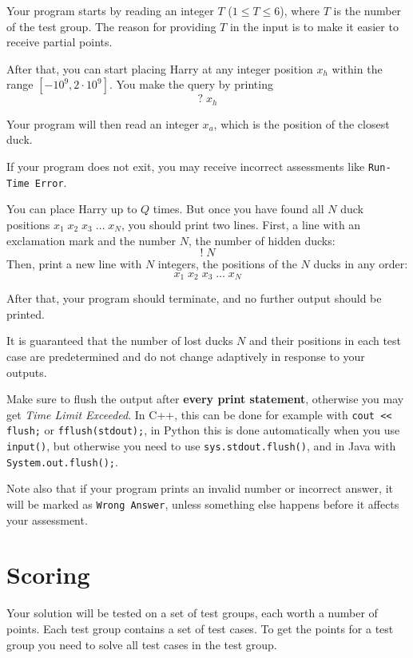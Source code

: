 Your program starts by reading an integer $T$ ($1 \leq T \leq 6$), where $T$ is the number of the test group. 
The reason for providing $T$ in the input is to make it easier to receive partial points.

After that, you can start placing Harry at any integer position $x_h$ within the range $[-10^9, 2 \cdot 10^9]$.
You make the query by printing 
$$? \; x_h$$

Your program will then read an integer $x_a$, which is the position of the closest duck. 

If your program does not exit, you may receive incorrect assessments like \texttt{Run-Time Error}.

You can place Harry up to $Q$ times. But once you have found all $N$ duck positions
$x_1 \; x_2 \; x_3 \; \dots \; x_N$, you should print two lines. 
First, a line with an exclamation mark and the number $N$, the number of hidden ducks:
$$! \; N$$
Then, print a new line with $N$ integers, the positions of the $N$ ducks in any order:
$$x_1 \; x_2 \; x_3 \; \dots \; x_N$$

After that, your program should terminate, and no further output should be printed.    

It is guaranteed that the number of lost ducks $N$ and their positions in each test case are predetermined and do
not change adaptively in response to your outputs.

Make sure to flush the output after \textbf{every print statement}, otherwise you may get
\textit{Time Limit Exceeded}.
In C++, this can be done for example with \texttt{cout << flush;} or \texttt{fflush(stdout);},
in Python this is done automatically when you use \texttt{input()}, but otherwise you need to use
\texttt{sys.stdout.flush()}, and in Java with \texttt{System.out.flush();}.

Note also that if your program prints an invalid number or incorrect answer, it will be marked as
\texttt{Wrong Answer}, unless something else happens before it affects your assessment. 

\section*{Scoring}
Your solution will be tested on a set of test groups, each worth a number of points. Each test group contains
a set of test cases. To get the points for a test group you need to solve all test cases in the test group.


